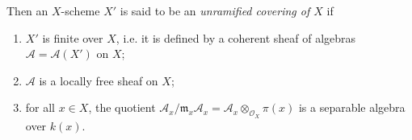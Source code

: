  Then an \(X\)-scheme \(X'\) is said to be an \emph{unramified covering of \(X\)} if

  
 \begin{enumerate}
    
 \item[i.]
      \(X'\) is finite over \(X\), i.e. it is defined by a coherent sheaf of algebras \(\mathscr {A}=\mathscr {A}(X')\) on \(X\);
    

    
 \item[ii.]
      \(\mathscr {A}\) is a locally free sheaf on \(X\);
    

    
 \item[iii.]
      for all \(x\in  X\), the quotient \(\mathscr {A}_x/\mathfrak {m}_x\mathscr {A}_x = \mathscr {A}_x\otimes _{\mathcal {O}_X}\pi (x)\) is a separable algebra over \(k(x)\).
    

  \end{enumerate}


